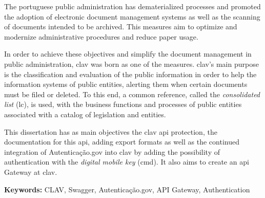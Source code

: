 The portuguese public administration has dematerialized processes and promoted the adoption of electronic document management systems as well as the scanning of documents intended to be archived. This measures aim to optimize and modernize administrative procedures and reduce paper usage.

In order to achieve these objectives and simplify the document management in public administration, \acrshort{clav} was born as one of the measures. \acrshort{clav}'s main purpose is the classification and evaluation of the public information in order to help the information systems of public entities, alerting them when certain documents must be filed or deleted. To this end, a common reference, called the \textit{consolidated list} (\acrlong{lc}), is used, with the business functions and processes of public entities associated with a catalog of legislation and entities.

This dissertation has as main objectives the \acrshort{clav} \acrshort{api} protection, the documentation for this \acrshort{api}, adding export formats as well as the continued integration of Autenticação.gov into \acrshort{clav} by adding the possibility of authentication with the \textit{digital mobile key} (\acrlong{cmd}). It also aims to create an \acrshort{api} Gateway at \acrshort{clav}.

\vspace{1cm}

\textbf{Keywords:} CLAV, Swagger, Autenticação.gov, API Gateway, Authentication
